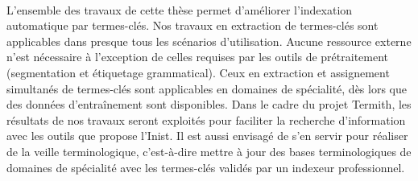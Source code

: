     ~\\L'ensemble des travaux de cette thèse permet d'améliorer l'indexation
    automatique par termes-clés. Nos travaux en extraction de termes-clés sont
    applicables dans presque tous les scénarios d'utilisation. Aucune ressource
    externe n'est nécessaire à l'exception de celles requises par les outils de
    prétraitement (segmentation et étiquetage grammatical). Ceux en
    extraction et assignement simultanés de termes-clés sont applicables en
    domaines de spécialité, dès lors que des données d'entraînement sont
    disponibles. Dans le cadre du projet Termith, les résultats de nos travaux
    seront exploités pour faciliter la recherche d'information avec les outils
    que propose l'Inist. Il est aussi envisagé de s'en servir pour réaliser de
    la veille terminologique, c'est-à-dire mettre à jour des bases
    terminologiques de domaines de spécialité avec les termes-clés validés par
    un indexeur professionnel.


